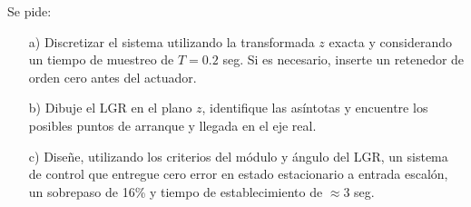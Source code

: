 \documentclass[
  11pt,
  letterpaper,
   addpoints,
  ]{exam}
\begin{document}
\begin{questions}
Se pide:
\begin{itemize}
    \item[a)] Discretizar el sistema utilizando la transformada \( z \) exacta y considerando un tiempo de muestreo de \( T = 0.2 \) seg. Si es necesario, inserte un retenedor de orden cero antes del actuador.
    \item[b)] Dibuje el LGR en el plano \( z \), identifique las asíntotas y encuentre los posibles puntos de arranque y llegada en el eje real.
    \item[c)] Diseñe, utilizando los criterios del módulo y ángulo del LGR, un sistema de control que entregue cero error en estado estacionario a entrada escalón, un sobrepaso de 16\% y tiempo de establecimiento de \( \approx 3 \) seg.
\end{itemize}
\begin{solution}

\end{solution}
\end{questions}
\end{document}
